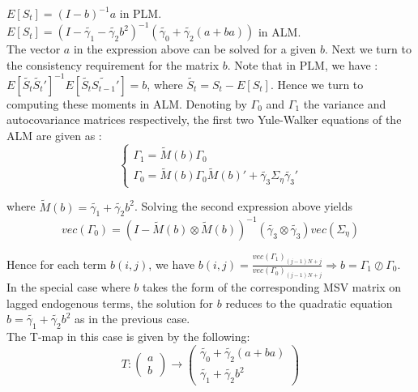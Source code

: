 \documentclass[12pt,reqno]{article}
\numberwithin{equation}{section}
\begin{document}
$ E [ S_t ] = (I-b)^{-1} a  $ in PLM.  \\

$ E [S_t] = ( I -  \tilde{\gamma_1} - \tilde{\gamma_2} b^2 )^{-1} (\tilde{\gamma_0} + \tilde{\gamma_2}(a+ba)  ) $ in ALM. \\

The vector $ a $ in the expression above can be solved for a given $ b $. Next we turn to the consistency requirement for the matrix $ b $. Note that in PLM, we have : \\

$ E [ \tilde{S_t} \tilde{S_t}']^{-1} E [ \tilde{S_t} \tilde{S_{t-1}}'] = b $, where $\tilde{S_t} = S_t - E[S_t]$. Hence we turn to computing these moments in ALM. Denoting by $\Gamma_0 $ and $\Gamma_1 $ the variance and autocovariance matrices respectively, the first two Yule-Walker equations of the ALM are given as : \\

$$
\begin{cases}
\Gamma_1 = \tilde{M}(b) \Gamma_0 \\
\Gamma_0 = \tilde{M}(b) \Gamma_0 \tilde{M}(b)' + \tilde{\gamma_3}\Sigma_{\eta} \tilde{\gamma_3}' 
\end{cases}
$$

where $\tilde{M}(b) = \tilde{\gamma_1} + \tilde{\gamma_2} b^2$. Solving the second expression above yields 
$$ vec(\Gamma_0) = (I- \tilde{M}(b) \otimes \tilde{M}(b))^{-1} (\tilde{\gamma_3} \otimes \tilde{\gamma_3}) vec(\Sigma_{\eta}) $$

Hence for each term $b(i,j) $, we have $ b(i,j) = \frac{vec(\Gamma_1)_{(j-1)N+j}}{vec(\Gamma_0)_{(j-1)N+j}} \Rightarrow b = \Gamma_1 \oslash \Gamma_0 $. \\

In the special case where $ b $ takes the form of the corresponding MSV matrix on lagged endogenous terms, the solution for $ b $ reduces to the quadratic equation $ b = \tilde{\gamma_1 } + \tilde{\gamma_2 } b^2 $ as in the previous case. \\

The T-map in this case is given by the following: \\

$$
T: \begin{pmatrix} a \\ b \end{pmatrix}  \rightarrow \begin{pmatrix} \tilde{\gamma_0} + \tilde{\gamma_2} (a+ba) \\ \tilde{\gamma_1} + \tilde{\gamma_2} b^2 \end{pmatrix} 
$$
\end{document}
